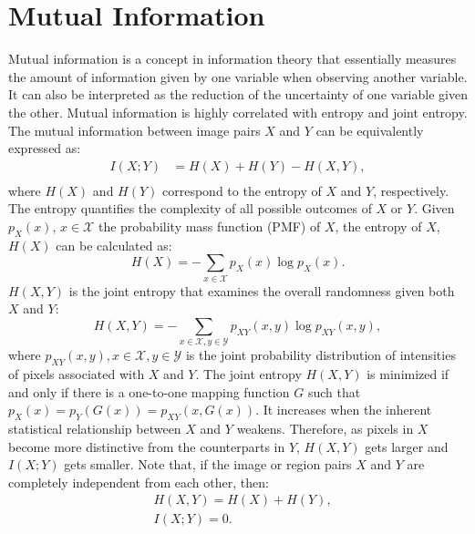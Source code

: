 \documentclass[10pt,twocolumn,letterpaper]{article}
\begin{document}
{ \section{Mutual Information}\label{sec:mi}
Mutual information is a concept in information theory that essentially measures the amount of information given by one variable when observing another variable. It can also be interpreted as the reduction of the uncertainty of one variable given the other. Mutual information is highly correlated with entropy and joint entropy. The mutual information between image pairs $X$ and $Y$ can be equivalently expressed as:
\begin{equation}\label{eq:overallmi}
\begin{split}
I(X;Y)  &=H(X)+H(Y)-H(X,Y), \\ 
\end{split}
\end{equation}
where $H(X)$ and $H(Y)$ correspond to the entropy of $X$ and $Y$, respectively. The entropy quantifies the complexity of all possible outcomes of $X$ or $Y$. Given $p_X(x)$, $x\in \mathcal{X}$ the probability mass function (PMF) of $X$, the entropy of $X$, $H(X)$ can be calculated as:
\begin{equation}\label{eq:entropy}
 H(X) = -\sum_{x\in \mathcal{X}}p_X(x)\log p_X(x).   
\end{equation}
$H(X,Y)$ is the joint entropy that examines the overall randomness given both $X$ and $Y$:
\begin{equation}\label{eq:jointentropy}
 H(X,Y) = -\sum_{x\in \mathcal{X},y\in\mathcal{Y}}p_{XY}(x,y)\log p_{XY}(x,y),   
\end{equation}
where $p_{XY}(x,y), x\in \mathcal{X},y\in\mathcal{Y}$ is the joint probability distribution of intensities of pixels associated with $X$ and $Y$. The joint entropy $H(X,Y)$ is minimized if and only if there is a one-to-one mapping function $G$ such that $p_X(x)=p_Y(G(x))=p_{XY}(x,G(x))$. It increases when the inherent statistical relationship between $X$ and $Y$ weakens. Therefore, as pixels in $X$ become more distinctive from the counterparts in $Y$, $H(X,Y)$ gets larger and $I(X;Y)$ gets smaller.
Note that, if the image or region pairs $X$ and $Y$ are completely independent from each other, then:
\begin{equation}
\begin{split}
        &H(X,Y) = H(X)+H(Y),\\
        &I(X;Y) = 0.\\
\end{split}

\end{equation}}
\end{document}
